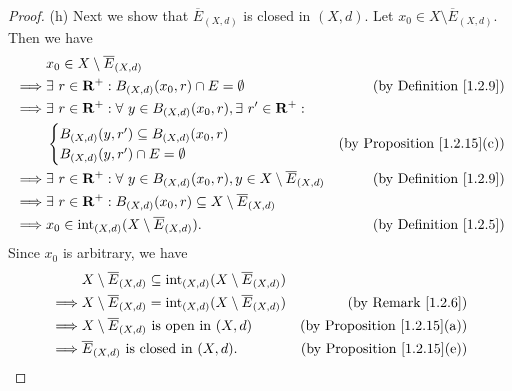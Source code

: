\begin{proof}{(h)}
    Next we show that \(\overline{E}_{(X, d)}\) is closed in \((X, d)\).
    Let \(x_0 \in X \setminus \overline{E}_{(X, d)}\).
    Then we have
    \begin{align*}
                 & x_0 \in X \setminus \overline{E}_{(X, d)}                                                                                                          \\
        \implies & \exists\ r \in \mathbf{R}^+ : B_{(X, d)}(x_0, r) \cap E = \emptyset                                      & \text{(by Definition \ref{1.2.9})}      \\
        \implies & \exists\ r \in \mathbf{R}^+ : \forall\ y \in B_{(X, d)}(x_0, r), \exists\ r' \in \mathbf{R}^+ :                                                    \\
                 & \begin{cases}
            B_{(X, d)}(y, r') \subseteq B_{(X, d)}(x_0, r) \\
            B_{(X, d)}(y, r') \cap E = \emptyset
        \end{cases}                                                                               & \text{(by Proposition \ref{1.2.15}(c))} \\
        \implies & \exists\ r \in \mathbf{R}^+ : \forall\ y \in B_{(X, d)}(x_0, r), y \in X \setminus \overline{E}_{(X, d)} & \text{(by Definition \ref{1.2.9})}      \\
        \implies & \exists\ r \in \mathbf{R}^+ : B_{(X, d)}(x_0, r) \subseteq X \setminus \overline{E}_{(X, d)}                                                       \\
        \implies & x_0 \in \text{int}_{(X, d)}(X \setminus \overline{E}_{(X, d)}).                                          & \text{(by Definition \ref{1.2.5})}
    \end{align*}
    Since \(x_0\) is arbitrary, we have
    \begin{align*}
                 & X \setminus \overline{E}_{(X, d)} \subseteq \text{int}_{(X, d)}(X \setminus \overline{E}_{(X, d)})                                           \\
        \implies & X \setminus \overline{E}_{(X, d)} = \text{int}_{(X, d)}(X \setminus \overline{E}_{(X, d)})         & \text{(by Remark \ref{1.2.6})}          \\
        \implies & X \setminus \overline{E}_{(X, d)} \text{ is open in } (X, d)                                       & \text{(by Proposition \ref{1.2.15}(a))} \\
        \implies & \overline{E}_{(X, d)} \text{ is closed in } (X, d).                                                & \text{(by Proposition \ref{1.2.15}(e))}
    \end{align*}


\end{proof}
